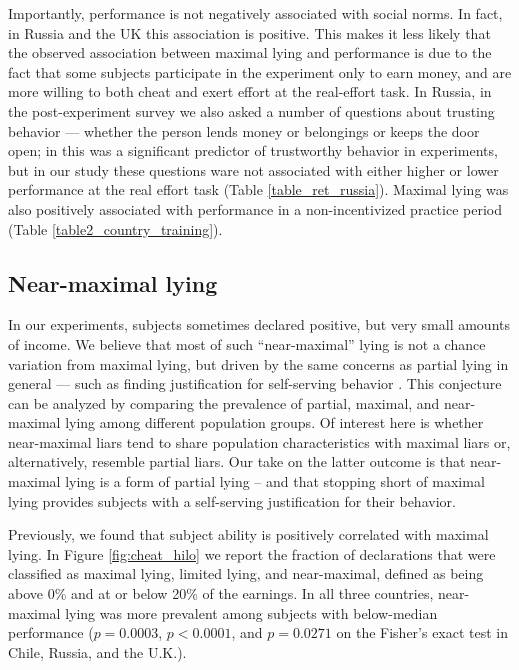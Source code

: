 \documentclass[12pt]{article}
\begin{document}
Importantly, performance is not negatively associated with social norms. In fact, in Russia and the UK this association is positive. This makes it less likely that the observed association between maximal lying and performance is due to the fact that some subjects participate in the experiment only to earn money, and are more willing to both cheat and exert effort at the real-effort task. In Russia, in the post-experiment survey we also asked a number of questions about 
trusting behavior --- whether the person lends money or belongings or keeps the door open; in 
\cite{glaeser2000measuring} this was a significant predictor of trustworthy behavior in experiments, but in our study these questions ware not associated with either higher or lower performance at the real effort task (Table \ref{table_ret_russia}). Maximal lying was also positively associated with performance in a non-incentivized practice period (Table \ref{table2_country_training}). 

\subsection{Near-maximal lying}
\label{nearmax}

\par In our experiments, subjects sometimes declared positive, but very small amounts of income. We believe that most of such ``near-maximal'' lying is not a chance variation from maximal lying, but driven by the same concerns as partial lying in general --- such as finding justification for self-serving behavior \citep{GinoAriely2016}. This conjecture can be analyzed by comparing the prevalence of partial, maximal, and near-maximal lying among different population groups. Of interest here is whether near-maximal liars tend to share population characteristics with maximal liars or, alternatively, resemble partial liars. Our take on the latter outcome is that near-maximal lying is a form of partial lying -- and that stopping short of maximal lying provides subjects with a self-serving justification for their behavior.  
 
\par Previously, we found that subject ability is positively correlated with maximal lying. In Figure \ref{fig:cheat_hilo} we report the fraction of declarations that were classified as maximal lying, limited lying, and near-maximal, defined as being above 0\% and at or below 20\% of the earnings. In all three countries, near-maximal lying was more prevalent among subjects with below-median performance ($p=0.0003$, $p<0.0001$, and $p=0.0271$ on the Fisher's exact test in Chile, Russia, and the U.K.).
\label{stata:nearmaxfig}
\end{document}
